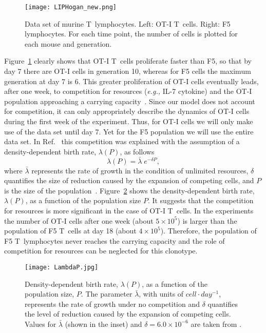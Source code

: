 \documentclass[10pt]{article}
\numberwithin{equation}{section}
\begin{document}
\begin{figure}[htbp]
    \centering
    \texttt{[image: LIPHogan\_new.png]}
    \caption{Data set of murine T~lymphocytes.
    Left: OT-I T~cells.   Right: F5 lymphocytes. For each time point, the number of cells is plotted for each mouse and  generation.}
    \label{hogan_dataset}
\end{figure}
 Figure~\ref{hogan_dataset} clearly
 shows that OT-I T~cells 
 proliferate faster than F5,
 so that by day 7 there are OT-I cells in generation 10,
 whereas for F5 cells the maximum generation at day 7 is 6.
 This greater proliferation of OT-I cells eventually leads, after one week, to competition for resources ({\em e.g.,} IL-7 cytokine) and 
 the OT-I population approaching a carrying capacity~\cite{hogan}. 
 Since our model does not account for competition, 
 it can only appropriately describe the  dynamics 
 of OT-I cells during the first week of the experiment.
 Thus, 
  for OT-I cells 
 we will only make use of the data set until day 7.
 Yet for the F5 population we will use the entire data set.
  In Ref.~\cite{hogan} this competition was explained  with the assumption of a density-dependent birth rate, $ \lambda(P)$, as follows 
\begin{equation}
\label{lam_eq}
    \lambda(P) = {\bar \lambda} \; e^{-\delta P},
\end{equation}
where ${\bar \lambda}$ represents the rate of growth in the condition of unlimited resources, $\delta$ quantifies the size of reduction caused by the expansion of competing cells, and $P$ is the size of the population~\cite{hogan}. Figure~\ref{lambda_P} 
shows the density-dependent birth rate, $\lambda(P)$, as a function of the population size $P$. It  suggests that the competition for resources is more significant in the case of OT-I T~cells.
In the experiments
 the number of OT-I cells after one week (about $5 \times 10^5$) is larger than the population of F5 T~cells at day 18 (about $4 \times 10^5$). Therefore, the population of F5 T~lymphocytes never reaches the carrying capacity and the role of competition for resources can be neglected for this clonotype.
\begin{figure}[h!]
    \centering
    \texttt{[image: LambdaP.jpg]}
    \caption{Density-dependent birth rate, $\lambda(P)$, as a function of the population size, $P$. The parameter ${\bar \lambda}$, with units of  $cell \cdot day^{-1}$, represents the rate of growth under no competition and $\delta$ quantifies the level of reduction caused by the expansion of competing cells. Values for ${\bar \lambda}$ (shown in the inset)
    and $\delta=6.0 \times 10^{-6}$ are taken from  \cite[Table 1]{hogan}.}
    \label{lambda_P}
\end{figure}
\end{document}

